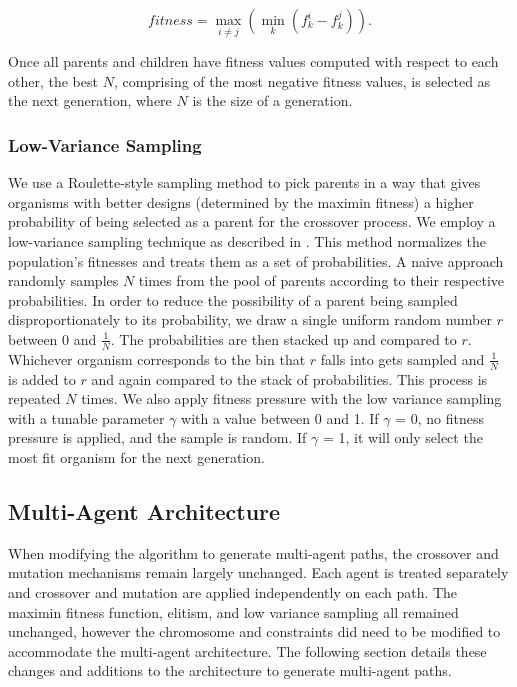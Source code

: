 \documentclass[letterpaper, 10 pt, conference]{ieeeconf}  %
\begin{document}
\begin{equation}%
    \mathit{fitness} = \max_{i \neq j}\left(\min_{k}\left(f_k^i - f_k^j\right)\right).
\end{equation}

Once all parents and children have fitness values computed with respect to each other, the best $N$, comprising of the most negative fitness values, is selected as the next generation, where $N$ is the size of a generation.

\subsubsection{Low-Variance Sampling}

We use a Roulette-style sampling method to pick parents in a way that gives organisms with better designs (determined by the maximin fitness) a higher probability of being selected as a parent for the crossover process. We employ a low-variance sampling technique as described in \cite{Thrun2006}. This method normalizes the population's fitnesses and treats them as a set of probabilities. A naive approach randomly samples $N$ times from the pool of parents according to their respective probabilities. In order to reduce the possibility of a parent being sampled disproportionately to its probability, we draw a single uniform random number $r$ between 0 and $\tfrac{1}{N}$. The probabilities are then stacked up and compared to $r$. Whichever organism corresponds to the bin that $r$ falls into gets sampled and $\tfrac{1}{N}$ is added to $r$ and again compared to the stack of probabilities. This process is repeated $N$ times. We also apply fitness pressure with the low variance sampling with a tunable parameter $\gamma$ with a value between 0 and 1. If $\gamma$ = 0, no fitness pressure is applied, and the sample is random. If $\gamma$ = 1, it will only select the most fit organism for the next generation.

\subsection{Multi-Agent Architecture}

When modifying the algorithm to generate multi-agent paths, the crossover and mutation mechanisms remain largely unchanged. Each agent is treated separately and crossover and mutation are applied independently on each path. The maximin fitness function, elitism, and low variance sampling all remained unchanged, however the chromosome and constraints did need to be modified to accommodate the multi-agent architecture. The following section details these changes and additions to the architecture to generate multi-agent paths.
\end{document}
